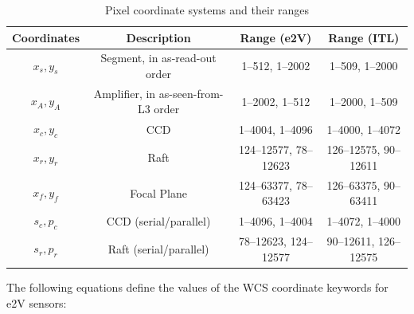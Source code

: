 \documentclass{article}[12pt]
\begin{document}
\begin{table}
\begin{centering}
\begin{tabular}{| c | c | c | c |}
\hline
{\bf Coordinates} & {\bf Description} & {\bf Range (e2V)} & {\bf Range (ITL)}  \\
\hline
$x_s, y_s$ & Segment, in as-read-out order & 1--512, 1--2002 & 1--509, 1--2000  \\
$x_A, y_A$ & Amplifier, in as-seen-from-L3 order & 1--2002, 1--512  & 1--2000, 1--509 \\
$x_c, y_c$ & CCD & 1--4004, 1--4096 & 1--4000, 1--4072  \\
$x_r, y_r$ & Raft & 124--12577, 78--12623  & 126--12575, 90--12611 \\
$x_f, y_f$ & Focal Plane & 124--63377, 78--63423 & 126--63375, 90--63411 \\
$s_c, p_c$ & CCD (serial/parallel) & 1--4096, 1--4004 & 1--4072, 1--4000 \\
$s_r, p_r$ & Raft (serial/parallel) & 78--12623, 124--12577 & 90--12611, 126--12575 \\
\hline
\end{tabular}
\caption{Pixel coordinate systems and their ranges \label{tab:coords}}
\end{centering}
\end{table}


The following equations define the values of the WCS coordinate keywords for e2V sensors:
\end{document}

